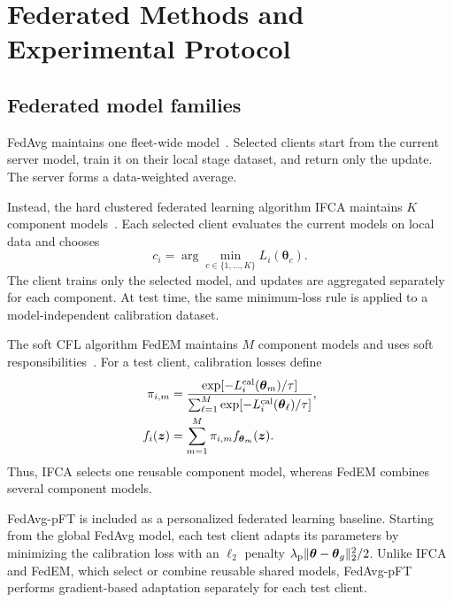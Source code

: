 \section{Federated Methods and Experimental Protocol}
\label{sec:experiment}
\subsection{Federated model families}
%
FedAvg maintains one fleet-wide model~\cite{mcmahan2017communication}.
Selected clients start from the current server model, train it on their local stage dataset, and return only the update. The server forms a data-weighted average.

Instead, the hard clustered federated learning algorithm IFCA maintains $K$ component models~\cite{ghosh2020_IFCA}.
Each selected client evaluates the current models on local data and chooses
%
\begin{equation}
    c_i=\arg\min_{c\in\{1,\ldots,K\}} L_i(\boldsymbol\theta_c).
    \label{eq:ifca}
\end{equation}
%
The client trains only the selected model, and updates are aggregated separately for each component.
At test time, the same minimum-loss rule is applied to a model-independent calibration dataset.

The soft CFL algorithm FedEM maintains $M$ component models and uses soft responsibilities~\cite{marfoq2021_FedEM}.
For a test client, calibration losses define
%
\begin{align}
    \pi_{i,m}&=\frac{\exp[-L_i^{\rm cal}(\boldsymbol\theta_m)/\tau]}{\sum_{\ell=1}^{M}\exp[-L_i^{\rm cal}(\boldsymbol\theta_\ell)/\tau]},\\
    f_i(\boldsymbol z)&=\sum_{m=1}^{M}\pi_{i,m}f_{\boldsymbol\theta_m}(\boldsymbol z).
    \label{eq:fedem}
\end{align}
%
Thus, IFCA selects one reusable component model, whereas FedEM combines several component models.

FedAvg-pFT is included as a personalized federated learning baseline. 
Starting from the global FedAvg model, each test client adapts its parameters by minimizing the calibration loss with an $\ell_2$ penalty $\lambda_{\rm p}\|\boldsymbol\theta-\boldsymbol\theta_g\|_2^2/2$.
Unlike IFCA and FedEM, which select or combine reusable shared models, FedAvg-pFT performs gradient-based adaptation separately for each test client.

